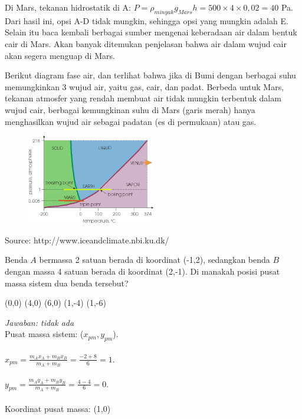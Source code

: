 \documentclass[11pt,fleqn]{exam}
\begin{document}
\begin{questions}
\noindent Di Mars, tekanan hidrostatik di A: $P=\rho_{minyak} g_{Mars} h=500\times 4\times 0,02=40$ Pa.\\
Dari hasil ini, opsi A-D tidak mungkin, sehingga opsi yang mungkin adalah E. Selain itu baca kembali berbagai sumber mengenai keberadaan air dalam bentuk cair di Mars. Akan banyak ditemukan penjelasan bahwa air dalam wujud cair akan segera menguap di Mars. 

Berikut diagram fase air, dan terlihat bahwa jika di Bumi dengan berbagai suhu memungkinkan 3 wujud air, yaitu gas, cair, dan padat. Berbeda untuk Mars, tekanan atmosfer yang rendah membuat air tidak mungkin terbentuk dalam wujud cair, berbagai kemungkinan suhu di Mars (garis merah) hanya menghasilkan wujud air sebagai padatan (es di permukaan) atau gas.
\begin{figure}[H]
\centering
\includegraphics[width=0.5\textwidth]{gambar/mars_phase_diagram.jpg}
\end{figure}
\begin{center}
Source: http://www.iceandclimate.nbi.ku.dk/
\end{center}
\vspace{0.2cm}


\question Benda $A$ bermassa 2 satuan berada di koordinat (-1,2), sedangkan benda $B$ dengan massa 4 satuan berada di koordinat (2,-1). Di manakah posisi pusat massa sistem dua benda tersebut?
\begin{choices}
\choice (0,0)
\choice (4,0)
\choice (6,0)
\choice (1,-4)
\choice (1,-6)
\end{choices}

\textit{Jawaban: tidak ada}\\
Pusat massa sistem: ($x_{pm},y_{pm}$).\\ \\
$x_{pm}=\frac{m_Ax_A+m_Bx_B}{m_A+m_B}=\frac{-2+8}{6}=1$.\\ \\
$y_{pm}=\frac{m_Ay_A+m_By_B}{m_A+m_B}=\frac{4-4}{6}=0$.\\ \\
Koordinat pusat massa: (1,0)\\



\end{questions}
\end{document}
